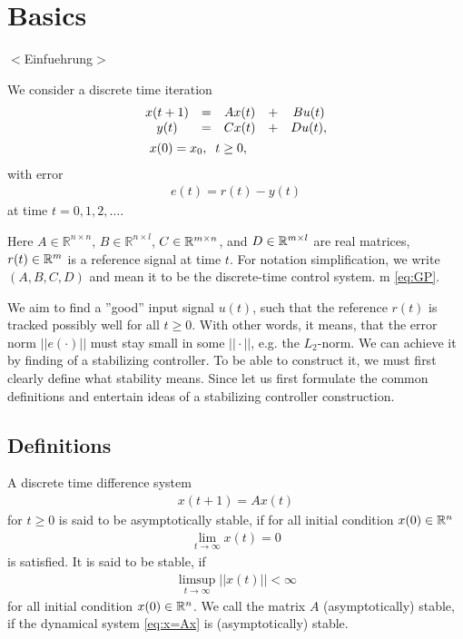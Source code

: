 \chapter{Basics} 
\label{ChGrDef}
{\color{red}$<$Einfuehrung$>$}

We consider a  discrete time iteration
\begin{align}
\label{eq:GP}
&\begin{array}{c c c c c}
x(t+1) &= &A x(t)& + &B u(t)  \\
y ( t) &= &C x(t)&  + &D u(t),\\ 
\end{array}\\
&\; \;\;x(0) =x_0 , \; \;  t \geq 0,
\end{align}
 with error 
\begin{align}
\label{eq:error}
e(t) =r(t) - y(t)
\end{align}
at time $t  = 0, 1, 2, \dots$.

Here $A \in \mathbb{R}^{n\times n}$, $B \in \mathbb{R}^{n \times l}$, $C \in {\mathbb{R}}^{m \times n}$, and $D \in {\mathbb{R}}^{m\times l}$ are real matrices, $r(t) \in {\mathbb{R}}^{m}$ is a reference signal at time $t$. For notation simplification, we write $(A, B,C,D)$ and mean it to be the discrete-time control system. m \eqref{eq:GP}.



We aim to find a ''good'' input signal $u(t)$, such that the reference $r(t)$ is tracked possibly well for all $t \geq 0$. With other words, it means, that the error norm $||e(\cdot)||$ must stay small in some  $||\cdot||$, e.g. the $L_2$-norm.
We can achieve it by finding of a stabilizing controller. To be able to construct it, we must first clearly define what stability means. Since let us first formulate the common definitions and entertain ideas of a stabilizing controller construction. 

\section{Definitions}

\begin{defi}
	A discrete time difference system
	\begin{align}
	\label{eq:x=Ax}
	x(t+1) = A x(t)
	\end{align}
	for $t \geq 0$ 
	is said to be asymptotically stable, if for all initial condition $x(0) \in {\mathbb{R}}^n$
	\begin{align}
	\lim_{t \to \infty} x(t) = 0
	\end{align}	
    is satisfied. 
	It is said to be stable, if 
	\begin{align}
	\limsup_{t \to \infty} ||x(t)|| < \infty
	\end{align}
	for all	 initial condition $x(0) \in {\mathbb{R}}^n$.
	We call the matrix $A$ (asymptotically) stable, if the dynamical system \eqref{eq:x=Ax} is (asymptotically) stable.
\end{defi}

